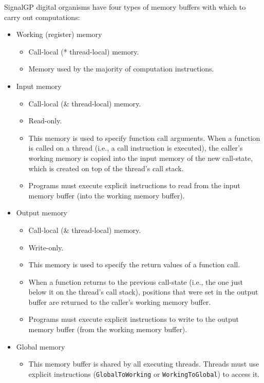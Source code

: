\documentclass[
]{book}
\providecommand{\tightlist}{%
  \setlength{\itemsep}{0pt}\setlength{\parskip}{0pt}}
\begin{document}
SignalGP digital organisms have four types of memory buffers with which to carry out computations:

\begin{itemize}
\tightlist
\item
  Working (register) memory

  \begin{itemize}
  \tightlist
  \item
    Call-local (* thread-local) memory.
  \item
    Memory used by the majority of computation instructions.
  \end{itemize}
\item
  Input memory

  \begin{itemize}
  \tightlist
  \item
    Call-local (\& thread-local) memory.
  \item
    Read-only.
  \item
    This memory is used to specify function call arguments. When a function is called on a thread (i.e.,
    a call instruction is executed), the caller's working memory is copied into the input memory of
    the new call-state, which is created on top of the thread's call stack.
  \item
    Programs must execute explicit instructions to read from the input memory buffer (into the working
    memory buffer).
  \end{itemize}
\item
  Output memory

  \begin{itemize}
  \tightlist
  \item
    Call-local (\& thread-local) memory.
  \item
    Write-only.
  \item
    This memory is used to specify the return values of a function call.
  \item
    When a function returns to the previous call-state (i.e., the one just below it on the thread's
    call stack), positions that were set in the output buffer are returned to the caller's working memory
    buffer.
  \item
    Programs must execute explicit instructions to write to the output memory buffer (from the working
    memory buffer).
  \end{itemize}
\item
  Global memory

  \begin{itemize}
  \tightlist
  \item
    This memory buffer is shared by all executing threads. Threads must use explicit instructions
    (\texttt{GlobalToWorking} or \texttt{WorkingToGlobal}) to access it.
  \end{itemize}
\end{itemize}
\end{document}
